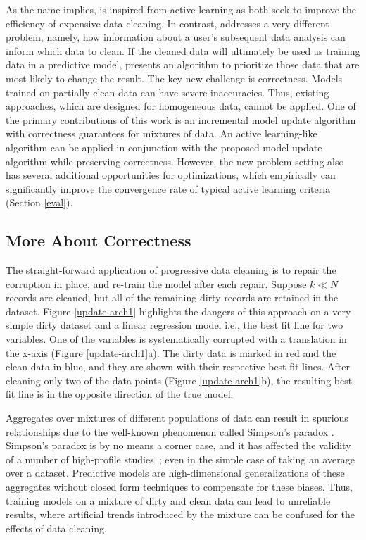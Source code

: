 As the name implies, \sys is inspired from active learning as both seek to improve the efficiency of expensive data cleaning.
In contrast, \sys addresses a very different problem, namely, how information about a user's subsequent data analysis can inform which data to clean.
If the cleaned data will ultimately be used as training data in a predictive model, \sys presents an algorithm to prioritize those data that are most likely to change the result.
The key new challenge is correctness.
Models trained on partially clean data can have severe inaccuracies.
Thus, existing approaches, which are designed for homogeneous data, cannot be applied.
One of the primary contributions of this work is an incremental model update algorithm with correctness guarantees for mixtures of data.
An active learning-like algorithm can be applied in conjunction with the proposed model update algorithm while preserving correctness.
However, the new problem setting also has several additional opportunities for optimizations, which empirically can significantly improve the convergence rate of typical active learning criteria (Section \ref{eval}).

\subsection{More About Correctness}\label{correctness}  
The straight-forward application of progressive data cleaning is to repair the corruption in place, and re-train the model after each repair.
Suppose $k \ll N$ records are cleaned, but all of the remaining dirty records are retained in the dataset.
Figure \ref{update-arch1} highlights the dangers of this approach on a very simple dirty dataset and a linear regression model i.e., the best fit line for two variables. 
One of the variables is systematically corrupted with a translation in the x-axis (Figure \ref{update-arch1}a).
The dirty data is marked in red and the clean data in blue, and they are shown with their respective best fit lines.
After cleaning only two of the data points (Figure \ref{update-arch1}b), the resulting best fit line is in the opposite direction of the true model.

Aggregates over mixtures of different populations of data can result in spurious relationships due to the well-known phenomenon called Simpson's paradox \cite{simpson1951interpretation}.
Simpson's paradox is by no means a corner case, and it has affected the validity of a number of high-profile studies~\cite{simpsonsparadox}; even in the simple case of taking an average over a dataset.
Predictive models are high-dimensional generalizations of these aggregates without closed form techniques to compensate for these biases.
Thus, training models on a mixture of dirty and clean data can lead to unreliable results, where artificial trends introduced by the mixture can be confused for the effects of data cleaning.

